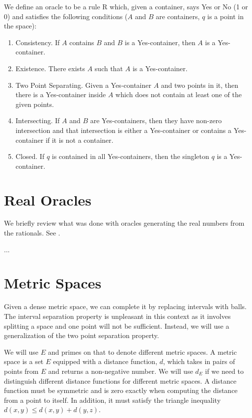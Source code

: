 We define an oracle to be a rule R which, given a container, says Yes or No (1 or 0) and satisfies the following conditions ($A$ and $B$ are containers, $q$ is a point in the space): 
\begin{enumerate}
    \item Consistency. If $A$ contains $B$ and $B$ is a Yes-container, then $A$ is a Yes-container.
    \item Existence. There exists $A$ such that $A$ is a Yes-container.
    \item Two Point Separating. Given a Yes-container $A$ and two points in it, then there is a Yes-container inside $A$ which does not contain at least one of the given points. 
    \item Intersecting. If $A$ and $B$ are Yes-containers, then they have non-zero intersection and that intersection is either a Yes-container or contains a Yes-container if it is not a container. 
    \item Closed. If $q$ is contained in all Yes-containers, then the singleton $q$ is a Yes-container. 
\end{enumerate}


\section{Real Oracles}

We briefly review what was done with oracles generating the real numbers from the rationals. See \cite{taylor23main}.

...



\section{Metric Spaces}

Given a dense metric space, we can complete it by replacing intervals with balls. The interval separation property is unpleasant in this context as it involves splitting a space and one point will not be sufficient. Instead, we will use a generalization of the two point separation property. 

We will use $E$ and primes on that to denote different metric spaces. A metric space is a set $E$ equipped with a distance function, $d$, which takes in pairs of points from $E$ and returns a non-negative number. We will use $d_E$ if we need to distinguish different distance functions for different metric spaces. A distance function must be symmetric and is zero exactly when computing the distance from a point to itself. In addition, it must satisfy the triangle inequality $d(x,y) \leq d(x,y) + d(y,z)$. 

